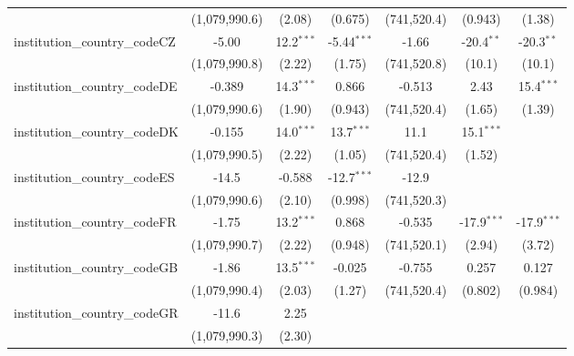 \begin{tabular}{lcccccc}
                                         & (1,079,990.6) & (2.08)        & (0.675)       & (741,520.4)   & (0.943)       & (1.38)\\   
   institution\_country\_codeCZ          & -5.00         & 12.2$^{***}$  & -5.44$^{***}$ & -1.66         & -20.4$^{**}$  & -20.3$^{**}$\\   
                                         & (1,079,990.8) & (2.22)        & (1.75)        & (741,520.8)   & (10.1)        & (10.1)\\   
   institution\_country\_codeDE          & -0.389        & 14.3$^{***}$  & 0.866         & -0.513        & 2.43          & 15.4$^{***}$\\   
                                         & (1,079,990.6) & (1.90)        & (0.943)       & (741,520.4)   & (1.65)        & (1.39)\\   
   institution\_country\_codeDK          & -0.155        & 14.0$^{***}$  & 13.7$^{***}$  & 11.1          & 15.1$^{***}$  &   \\   
                                         & (1,079,990.5) & (2.22)        & (1.05)        & (741,520.4)   & (1.52)        &   \\   
   institution\_country\_codeES          & -14.5         & -0.588        & -12.7$^{***}$ & -12.9         &               &   \\   
                                         & (1,079,990.6) & (2.10)        & (0.998)       & (741,520.3)   &               &   \\   
   institution\_country\_codeFR          & -1.75         & 13.2$^{***}$  & 0.868         & -0.535        & -17.9$^{***}$ & -17.9$^{***}$\\   
                                         & (1,079,990.7) & (2.22)        & (0.948)       & (741,520.1)   & (2.94)        & (3.72)\\   
   institution\_country\_codeGB          & -1.86         & 13.5$^{***}$  & -0.025        & -0.755        & 0.257         & 0.127\\   
                                         & (1,079,990.4) & (2.03)        & (1.27)        & (741,520.4)   & (0.802)       & (0.984)\\   
   institution\_country\_codeGR          & -11.6         & 2.25          &               &               &               &   \\   
                                         & (1,079,990.3) & (2.30)        &               &               &               &   \\   

\end{tabular}
